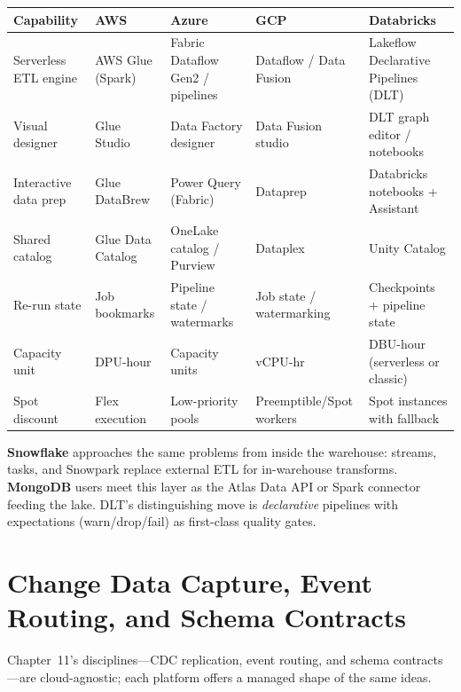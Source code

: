 \begin{center}
\footnotesize
\begin{tabular}{@{}p{2.4cm}p{2.9cm}p{2.9cm}p{2.9cm}p{2.9cm}@{}}
\toprule
\textbf{Capability} & \textbf{AWS} & \textbf{Azure} & \textbf{GCP} & \textbf{Databricks} \\
\midrule
Serverless ETL engine & AWS Glue (Spark) & Fabric Dataflow Gen2 / pipelines & Dataflow / Data Fusion & Lakeflow Declarative Pipelines (DLT) \\
Visual designer & Glue Studio & Data Factory designer & Data Fusion studio & DLT graph editor / notebooks \\
Interactive data prep & Glue DataBrew & Power Query (Fabric) & Dataprep & Databricks notebooks + Assistant \\
Shared catalog & Glue Data Catalog & OneLake catalog / Purview & Dataplex & Unity Catalog \\
Re-run state & Job bookmarks & Pipeline state / watermarks & Job state / watermarking & Checkpoints + pipeline state \\
\addlinespace
Capacity unit & DPU-hour & Capacity units & vCPU-hr & DBU-hour (serverless or classic) \\
Spot discount & Flex execution & Low-priority pools & Preemptible/Spot workers & Spot instances with fallback \\
\bottomrule
\end{tabular}
\end{center}

\noindent \textbf{Snowflake} approaches the same problems from inside the warehouse: streams,
tasks, and Snowpark replace external ETL for in-warehouse transforms. \textbf{MongoDB} users meet
this layer as the Atlas Data API or Spark connector feeding the lake. DLT's distinguishing move
is \emph{declarative} pipelines with expectations (warn/drop/fail) as first-class quality gates.

\section{Change Data Capture, Event Routing, and Schema Contracts}
%
Chapter~11's disciplines---CDC replication, event routing, and schema contracts---are
cloud-agnostic; each platform offers a managed shape of the same ideas.

